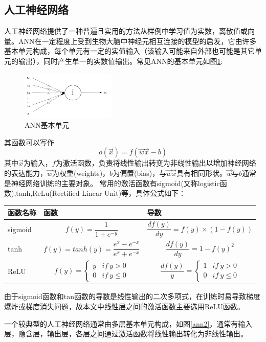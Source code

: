 \subsection{人工神经网络}
人工神经网络提供了一种普遍且实用的方法从样例中学习值为实数，离散值或向量。ANN在一定程度上受到生物大脑中神经元相互连接的模型的启发，它由许多基本单元构成，每个单元有一定的实值输入（该输入可能来自外部也可能是其它单元的输出），同时产生单一的实数值输出。常见ANN的基本单元如图\ref{ann1}:
\begin{figure}[!hbp]
\begin{center}
\includegraphics[width=0.4\textwidth]{graphic/ann1.png}
\caption{ANN基本单元\cite{ml2006} \label{ann1}}
\end{center}
\end{figure}
其函数可以写作
\begin{equation}
o(\vec{x}) = f(\vec{w} \vec{x} - b)
\end{equation}
其中$\vec{x}$为输入，$f$为激活函数，负责将线性输出转变为非线性输出以增加神经网络的表达能力，$\vec{w}$为权重(weights)，$b$为偏置(bias)，与$\vec{w} \vec{x} $具有相同形状。$\vec{w}$与$b$通常是神经网络训练的主要对象。
常用的激活函数有sigmoid(又称logistic函数),tanh,ReLu(Rectified Linear Unit)等，具体公式如下：
\begin{center}
\begin{tabu}  to 0.8\textwidth{X|X[3]|X[3]}
\hline
函数名称 & 函数 & 导数 \\
\hline
sigmoid &
$$
f(y) = \frac{1}{1 + e^{-y}}
$$
&
$$
\frac{df(y)}{dy} = f(y) \times (1 - f(y))
$$
\\ \hline
tanh &
$$
f(y) = tanh(y) = \frac{e^x - e^{-x}}{e^x + e^{-x}}
$$
&
$$
\frac{df(y)}{dy} = 1 - {f(y)}^2
$$
\\ \hline
ReLU &
$$
f(y) = \left\{\begin{matrix}
y & if\ y > 0\\ 
0 & if\ y \leq 0
\end{matrix}\right.
$$
&
$$
\frac{df(y)}{y} = \left\{\begin{matrix}
1 & if\ y > 0\\ 
0 & if\ y \leq 0
\end{matrix}\right.
$$
\\ \hline
\end{tabu}
\end{center}
由于sigmoid函数和tan函数的导数是线性输出的二次多项式，在训练时易导致梯度爆炸或梯度消失问题，故本文中线性层之间的激活函数主要选用ReLU函数。\par
一个较典型的人工神经网络通常由多层基本单元构成，如图\ref{ann2}，通常有输入层，隐含层，输出层，各层之间通过激活函数将线性输出转化为非线性输出。\par


